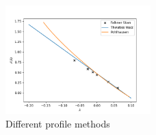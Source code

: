 \documentclass[conf]{new-aiaa}
\begin{document}
\begin{center}
    \resizebox{0.40\linewidth}{!}{}\label{tab:table1}
\end{center}

\begin{figure}[H]
    \centering
    \includegraphics[width=0.5\textwidth]{Thwaites Walz.png}
    \caption{Different profile methods}
    \label{fig:multiple profiles}
\end{figure}
\end{document}

